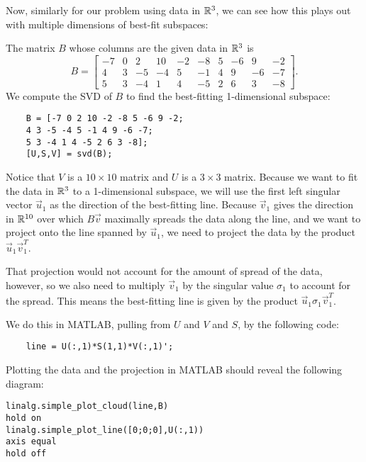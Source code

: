 \documentclass{ximera}
\begin{document}
Now, similarly for our problem using data in $\mathbb{R}^3$, we can see how this plays out with multiple dimensions of best-fit subspaces:

\begin{problem}
  The matrix $B$ whose columns are the given data in $\mathbb{R}^3$ is
  \begin{equation*}
    B = \begin{bmatrix}
      -7 & 0 & 2 & 10 & -2 & -8 & 5 & -6 & 9 & -2 \\
      4 & 3 & -5 & -4 & 5 & -1 & 4 & 9 & -6 & -7 \\
      5 & 3 & -4 & 1 & 4 & -5 & 2 & 6 & 3 & -8
    \end{bmatrix}.
  \end{equation*}
  We compute the SVD of $B$ to find the best-fitting 1-dimensional subspace:

  \begin{verbatim}
    B = [-7 0 2 10 -2 -8 5 -6 9 -2; 
    4 3 -5 -4 5 -1 4 9 -6 -7; 
    5 3 -4 1 4 -5 2 6 3 -8];
    [U,S,V] = svd(B);
  \end{verbatim}

  Notice that $V$ is a $10\times 10$ matrix and $U$ is a $3\times 3$ matrix. Because we want to fit the data in $\mathbb{R}^3$ to a 1-dimensional subspace, we will use the first left singular vector $\vec{u}_1$ as the direction of the best-fitting line. Because $\vec{v}_1$ gives the direction in $\mathbb{R}^{10}$ over which $B\vec{v}$ maximally spreads the data along the line, and we want to project onto the line spanned by $\vec{u}_1$, we need to project the data by the product $\vec{u}_1\vec{v}_1^T$. 
  
  That projection would not account for the amount of spread of the data, however, so we also need to multiply $\vec{v}_1$ by the singular value $\sigma_1$ to account for the spread. This means the best-fitting line is given by the product $\vec{u}_1\sigma_1\vec{v}_1^T$.

  We do this in MATLAB, pulling from $U$ and $V$ and $S$, by the following code:

  \begin{verbatim}
    line = U(:,1)*S(1,1)*V(:,1)';
  \end{verbatim}

  Plotting the data and the projection in MATLAB should reveal the following diagram:

  \begin{verbatim}
linalg.simple_plot_cloud(line,B)
hold on
linalg.simple_plot_line([0;0;0],U(:,1))
axis equal
hold off
  \end{verbatim}


\end{problem}
\end{document}

